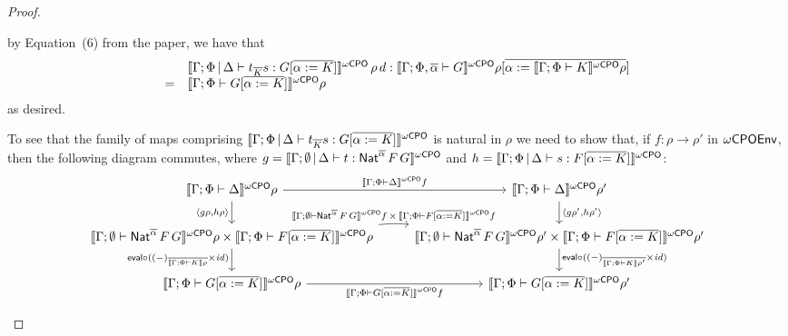 \documentclass[acmsmall,review,anonymous]{acmart}
\theoremstyle{definition}
\renewcommand{\id}{\mathit{id}}
\begin{document}
\begin{proof}
\begin{itemize}
      by Equation~(6) from the paper,
we have that 
\[\begin{array}{ll}
  &\llbracket{\Gamma;\Phi \,|\, \Delta
  \vdash t_{\overline K} s: G [\overline{\alpha :=
      K}]}\rrbracket^{{\omega\mathsf{CPO}}}\,\rho\,d : \llbracket{\Gamma; \Phi ,\overline{\alpha} \vdash
  G}\rrbracket^{{\omega\mathsf{CPO}}}\rho[\overline{\alpha := \llbracket{\Gamma;\Phi \vdash K}\rrbracket^{{\omega\mathsf{CPO}}}\rho}]  \\
  =&\llbracket{\Gamma; \Phi \vdash G[\overline{\alpha := K}]}\rrbracket^{{\omega\mathsf{CPO}}}\rho
\end{array}\]
as desired.

\vspace*{0.1in}

To see that the family of maps comprising $\llbracket{\Gamma;\Phi \,|\,
  \Delta \vdash t_{\overline K} s: G [\overline{\alpha := K}]}\rrbracket^{{\omega\mathsf{CPO}}}$
is natural in $\rho$
we need to show that, if $f : \rho \to \rho'$ in $\omega\mathsf{CPOEnv}$, then the
following diagram commutes, where $g = \llbracket{\Gamma; \emptyset \,|\,
  \Delta \vdash t : \mathsf{Nat}^{\overline{\alpha}} \,F \,G}\rrbracket^{{\omega\mathsf{CPO}}}$ and $h =
\llbracket{\Gamma;\Phi \,|\, \Delta \vdash s: F [\overline{\alpha :=
      K}]}\rrbracket^{{\omega\mathsf{CPO}}}$:
{\footnotesize
\[\begin{tikzcd}
\oCPOsem{\Gamma;\Phi \vdash \Delta}\rho \ar[r, "{\oCPOsem{\Gamma;\Phi
  \vdash \Delta}f}"] \ar[d, "{\langle g \rho, h \rho\rangle}"']
& \oCPOsem{\Gamma;\Phi \vdash 
  \Delta}\rho' \ar[d, "{\langle g \rho', h \rho' \rangle}"]\\
\oCPOsem{\Gamma;\emptyset \vdash \Nat^{\overline{\alpha}} \,F \,G}\rho
\times \oCPOsem{\Gamma;\Phi \vdash F [\overline{\alpha := K}]}\rho
\ar[d, "{\eval \circ ((-)_{\overline{\sem{\Gamma;\Phi \vdash K}\rho}} \times
    \id)}"']
\ar[r, bend left = 5, "{\oCPOsem{\Gamma;\emptyset\vdash
      \Nat^{\overline{\alpha}} \,F \,G}f\, \times\, \oCPOsem{\Gamma;\Phi
      \vdash F [\overline{\alpha := K}]}f}"] &
\oCPOsem{\Gamma;\emptyset \vdash \Nat^{\overline{\alpha}} \,F \,G}\rho'
\times \oCPOsem{\Gamma;\Phi \vdash F [\overline{\alpha := K}]}\rho'
\ar[d, "{\eval \circ ((-)_{\overline{\sem{\Gamma;\Phi \vdash
          K}\rho'}} \times \id)}"] \\
\oCPOsem{\Gamma;\Phi \vdash G [\overline{\alpha := K}]}\rho
\ar[r, "{\oCPOsem{\Gamma;\Phi \vdash G [\overline{\alpha := K}]}f}"']
&
\oCPOsem{\Gamma;\Phi \vdash G [\overline{\alpha := K}]}\rho'
\end{tikzcd}\]}


\end{itemize}
\end{proof}
\end{document}
